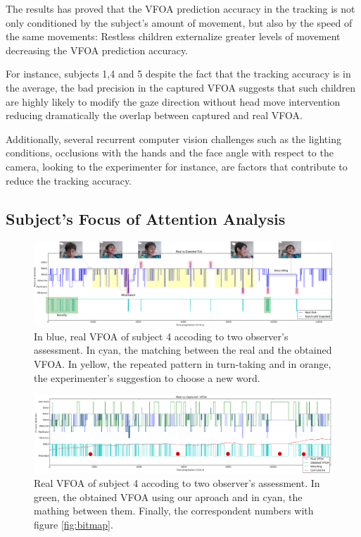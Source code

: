 \documentclass{sig-alternate}
\begin{document}
The results has proved that the VFOA prediction accuracy in the tracking is not
only conditioned by the subject's amount of movement, but also by the speed of
the same movements: Restless children externalize greater levels of movement
decreasing the VFOA prediction accuracy. 

For instance, subjects 1,4 and 5 despite the fact that the tracking accuracy is
in the average, the bad precision in the captured VFOA suggests that such
children are highly likely to modify the gaze direction without head move
intervention reducing dramatically the overlap between captured and real VFOA.

Additionally, several recurrent computer vision challenges such as the lighting
conditions, occlusions with the hands and the face angle with respect to the
camera, looking to the experimenter for instance, are factors that contribute to
reduce the tracking accuracy.

\subsection{Subject's Focus of Attention Analysis}

\begin{figure}
    \centering
    \includegraphics[width=1.8\columnwidth]{realExpected}
    \caption{\small In blue, real VFOA of subject 4 accoding to two observer's
    assessment. In cyan, the matching between the real and the obtained VFOA. In
    yellow, the repeated pattern in turn-taking and in orange, the experimenter's
    suggestion to choose a new word.}

    \label{fig:realExpected}
    
\end{figure}

\begin{figure}
    \centering
    \includegraphics[width=1.81\columnwidth]{realCaptured}
    \caption{\small Real VFOA of subject 4 accoding to two observer's
    assessment. In green, the obtained VFOA using our aproach and in cyan, the
    mathing between them. Finally, the correspondent numbers with figure \ref{fig:bitmap}.}

    \label{fig:realCaptured}
\end{figure}
\end{document}
